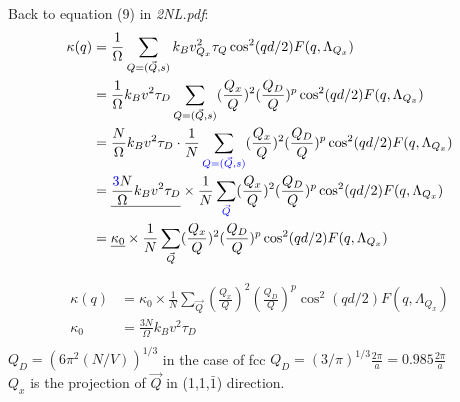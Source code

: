 \documentclass{article}
\begin{document}
Back to equation (9) in \textit{2NL.pdf}:
\begin{equation*}
\begin{split}
\kappa(q)&=\frac{1}{\Omega}\sum\limits_{Q=(\vec{Q},s)}k_B v^2_{Q_x}\tau_Q\cos^2(qd/2)F(q,\Lambda_{Q_x})\\
&=\frac{1}{\Omega}k_B v^2\tau_D \sum\limits_{Q=(\vec{Q},s)}(\frac{Q_x}{Q})^2(\frac{Q_D}{Q})^p\cos^2(qd/2)F(q,\Lambda_{Q_x})\\
&=\frac{N}{\Omega}k_B v^2\tau_D \cdot\frac{1}{N}\sum\limits_{\color{blue}Q=(\vec{Q},s)}(\frac{Q_x}{Q})^2(\frac{Q_D}{Q})^p\cos^2(qd/2)F(q,\Lambda_{Q_x})\\
&=\underline{\frac{{\color{blue}3}N}{\Omega}k_B v^2\tau_D }\times\frac{1}{N}\sum\limits_{\color{blue}\vec{Q}}(\frac{Q_x}{Q})^2(\frac{Q_D}{Q})^p\cos^2(qd/2)F(q,\Lambda_{Q_x})\\
&=\underline{\kappa_0}\times\frac{1}{N}\sum\limits_{\vec{Q}}(\frac{Q_x}{Q})^2(\frac{Q_D}{Q})^p\cos^2(qd/2)F(q,\Lambda_{Q_x})\\
\end{split}
\end{equation*}

\begin{equation*}
\begin{split}
\kappa(q)&=\kappa_0\times\frac{1}{N}\sum\limits_{\vec{Q}}(\frac{Q_x}{Q})^2(\frac{Q_D}{Q})^p\cos^2(qd/2)F(q,\Lambda_{Q_x})\\
\kappa_0 &=\frac{3N}{\Omega}k_B v^2\tau_D\\
\end{split}
\end{equation*}
$Q_D=(6\pi^2(N/V))^{1/3}$ in the case of fcc $Q_D=(3/\pi)^{1/3}\frac{2\pi}{a}=0.985\frac{2\pi}{a}$\\
$Q_x$ is the projection of $\vec{Q}$ in (1,1,$\bar{1}$) direction.
\end{document}
